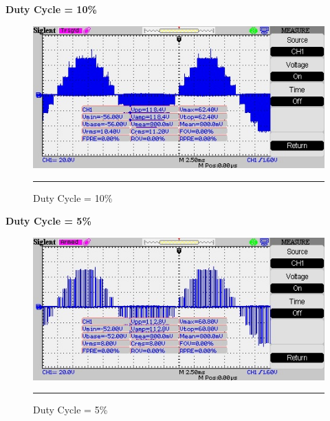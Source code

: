 \textbf{Duty Cycle = 10\%}
\begin{figure}[htbp]
	\centering
	\includegraphics[width = 6in]{./Figures/Photos/Hardware/42}
	\rule{35em}{1pt}
	\caption{Duty Cycle = 10\%}
\end{figure}

\newpage
\textbf{Duty Cycle = 5\%}
\begin{figure}[htbp]
	\centering
	\includegraphics[width = 6in]{./Figures/Photos/Hardware/43}
	\rule{35em}{1pt}
	\caption{Duty Cycle = 5\%}
\end{figure}

